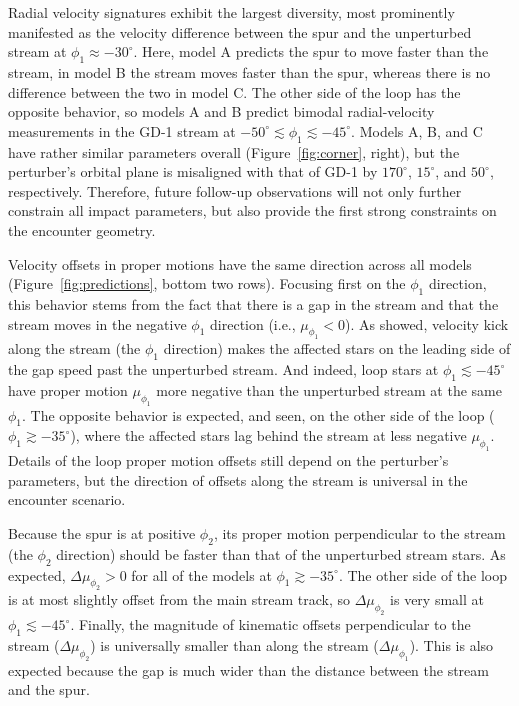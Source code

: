 \documentclass[twocolumn]{aastex62}
\begin{document}
Radial velocity signatures exhibit the largest diversity, most prominently manifested as the velocity difference between the spur and the unperturbed stream at $\phi_1\approx-30^\circ$.
Here, model A predicts the spur to move faster than the stream, in model B the stream moves faster than the spur, whereas there is no difference between the two in model C.
The other side of the loop has the opposite behavior, so models A and B predict bimodal radial-velocity measurements in the GD-1 stream at $-50^\circ\lesssim\phi_1\lesssim-45^\circ$.
Models A, B, and C have rather similar parameters overall (Figure~\ref{fig:corner}, right), but the perturber's orbital plane is misaligned with that of GD-1 by $170^\circ$, $15^\circ$, and $50^\circ$, respectively.
Therefore, future follow-up observations will not only further constrain all impact parameters, but also provide the first strong constraints on the encounter geometry.

Velocity offsets in proper motions have the same direction across all models (Figure~\ref{fig:predictions}, bottom two rows).
Focusing first on the $\phi_1$ direction, this behavior stems from the fact that there is a gap in the stream and that the stream moves in the negative $\phi_1$ direction (i.e., $\mu_{\phi_1}<0$).
As \citet{eb2015} showed, velocity kick along the stream (the $\phi_1$ direction) makes the affected stars on the leading side of the gap speed past the unperturbed stream.
And indeed, loop stars at $\phi_1\lesssim-45^\circ$ have proper motion $\mu_{\phi_1}$ more negative than the unperturbed stream at the same $\phi_1$.
The opposite behavior is expected, and seen, on the other side of the loop ($\phi_1\gtrsim-35^\circ$), where the affected stars lag behind the stream at less negative $\mu_{\phi_1}$.
Details of the loop proper motion offsets still depend on the perturber's parameters, but the direction of offsets along the stream is universal in the encounter scenario.

Because the spur is at positive $\phi_2$, its proper motion perpendicular to the stream (the $\phi_2$ direction) should be faster than that of the unperturbed stream stars.
As expected, $\Delta\mu_{\phi_2}>0$ for all of the models at $\phi_1\gtrsim-35^\circ$.
The other side of the loop is at most slightly offset from the main stream track, so $\Delta\mu_{\phi_2}$ is very small at $\phi_1\lesssim-45^\circ$.
Finally, the magnitude of kinematic offsets perpendicular to the stream ($\Delta\mu_{\phi_2}$) is universally smaller than along the stream ($\Delta\mu_{\phi_1}$).
This is also expected because the gap is much wider than the distance between the stream and the spur.
\end{document}
